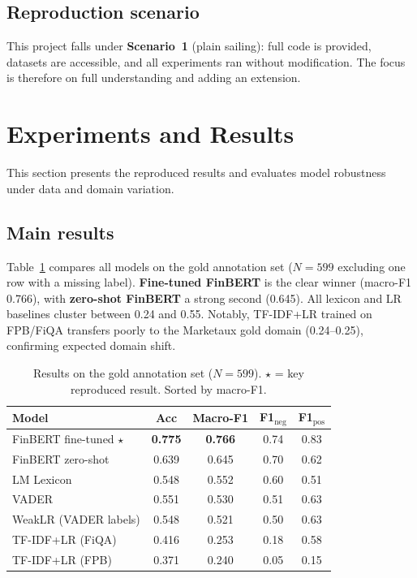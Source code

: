 \documentclass[11pt]{article}
\begin{document}
\subsection{Reproduction scenario}
This project falls under \textbf{Scenario~1} (plain sailing): full code is
provided, datasets are accessible, and all experiments ran without
modification. The focus is therefore on full understanding and adding an
extension.

\section{Experiments and Results}
\label{sec:experiments}
This section presents the reproduced results and evaluates model robustness under data and domain variation.

\subsection{Main results}

Table~\ref{tab:results} compares all models on the gold annotation set
($N=599$ excluding one row with a missing label). \textbf{Fine-tuned
FinBERT} is the clear winner (macro-F1 0.766), with \textbf{zero-shot
FinBERT} a strong second (0.645). All lexicon and LR baselines cluster
between 0.24 and 0.55. Notably, TF-IDF+LR trained on FPB/FiQA transfers
poorly to the Marketaux gold domain (0.24--0.25), confirming expected
domain shift.

\begin{table}[h]
\centering
\small
\begin{tabular}{lcccc}
\toprule
\textbf{Model} & \textbf{Acc} & \textbf{Macro-F1} & \textbf{F1$_\text{neg}$} & \textbf{F1$_\text{pos}$} \\
\midrule
FinBERT fine-tuned $\star$ & \textbf{0.775} & \textbf{0.766} & 0.74 & 0.83 \\
FinBERT zero-shot           & 0.639 & 0.645 & 0.70 & 0.62 \\
LM Lexicon                  & 0.548 & 0.552 & 0.60 & 0.51 \\
VADER                       & 0.551 & 0.530 & 0.51 & 0.63 \\
WeakLR (VADER labels)       & 0.548 & 0.521 & 0.50 & 0.63 \\
TF-IDF+LR (FiQA)            & 0.416 & 0.253 & 0.18 & 0.58 \\
TF-IDF+LR (FPB)             & 0.371 & 0.240 & 0.05 & 0.15 \\
\bottomrule
\end{tabular}
\caption{Results on the gold annotation set ($N=599$). $\star$ = key
  reproduced result. Sorted by macro-F1.}
\label{tab:results}
\end{table}
\end{document}
